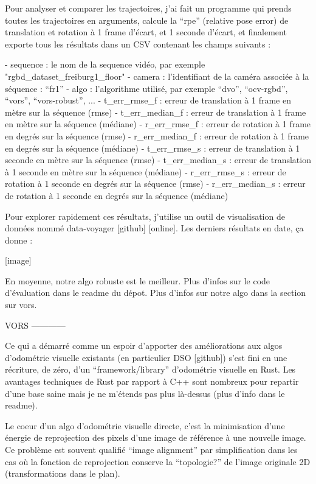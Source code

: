 Pour analyser et comparer les trajectoires, j’ai fait un programme qui prends toutes les trajectoires en arguments, calcule la “rpe” (relative pose error) de translation et rotation à 1 frame d’écart, et 1 seconde d’écart, et finalement exporte tous les résultats dans un CSV contenant les champs suivants :

- sequence : le nom de la sequence vidéo, par exemple "rgbd\_dataset\_freiburg1\_floor"
- camera : l’identifiant de la caméra associée à la séquence : “fr1”
- algo : l’algorithme utilisé, par exemple “dvo”, “ocv-rgbd”, “vors”, “vors-robust”, ...
- t\_err\_rmse\_f : erreur de translation à 1 frame en mètre sur la séquence (rmse)
- t\_err\_median\_f : erreur de translation à 1 frame en mètre sur la séquence (médiane)
- r\_err\_rmse\_f : erreur de rotation à 1 frame en degrés sur la séquence (rmse)
- r\_err\_median\_f : erreur de rotation à 1 frame en degrés sur la séquence (médiane)
- t\_err\_rmse\_s : erreur de translation à 1 seconde en mètre sur la séquence (rmse)
- t\_err\_median\_s : erreur de translation à 1 seconde en mètre sur la séquence (médiane)
- r\_err\_rmse\_s : erreur de rotation à 1 seconde en degrés sur la séquence (rmse)
- r\_err\_median\_s : erreur de rotation à 1 seconde en degrés sur la séquence (médiane)

Pour explorer rapidement ces résultats, j’utilise un outil de visualisation de données nommé data-voyager [github] [online]. Les derniers résultats en date, ça donne :

[image]

En moyenne, notre algo robuste est le meilleur. Plus d’infos sur le code d’évaluation dans le readme du dépot. Plus d’infos sur notre algo dans la section sur vors.



VORS
------------


Ce qui a démarré comme un espoir d’apporter des améliorations aux algos d’odométrie visuelle existants (en particulier DSO [github]) s’est fini en une récriture, de zéro, d’un “framework/library” d’odométrie visuelle en Rust. Les avantages techniques de Rust par rapport à C++ sont nombreux pour repartir d’une base saine mais je ne m’étends pas plus là-dessus (plus d’info dans le readme).

Le coeur d’un algo d’odométrie visuelle directe, c’est la minimisation d’une énergie de reprojection des pixels d’une image de référence à une nouvelle image. Ce problème est souvent qualifié “image alignment” par simplification dans les cas où la fonction de reprojection conserve la “topologie?” de l’image originale 2D (transformations dans le plan).

